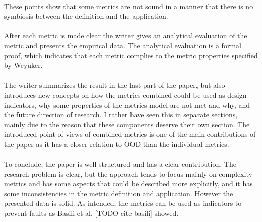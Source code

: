\paragraph{}
These points show that some metrics are not sound in a manner that there is no symbiosis between the definition and
the application.

\paragraph{}
After each metric is made clear the writer gives an analytical evaluation of the metric and presents the empirical
data. The analytical evaluation is a formal proof, which indicates that each metric complies to the metric properties
specified by Weyuker.

\paragraph{}
The writer summarizes the result in the last part of the paper, but also introduces new concepts on how the metrics
combined could be used as design indicators, why some properties of the metrics model are not met and why, and the
future direction of research. I rather have seen this in separate sections, mainly due to the reason that these
components deserve their own section. The introduced point of views of combined metrics is one of the main contributions
of the paper as it has a closer relation to OOD than the individual metrics.

\paragraph{}
To conclude, the paper is well structured and has a clear contribution. The research problem is clear, but the
approach tends to focus mainly on complexity metrics and has some aspects that could be described more explicitly, and it
has some inconsistencies in the metric definition and application. However the presented data is solid.
As intended, the metrics can be used as indicators to prevent faults as Basili et al. [TODO cite basili] showed.
